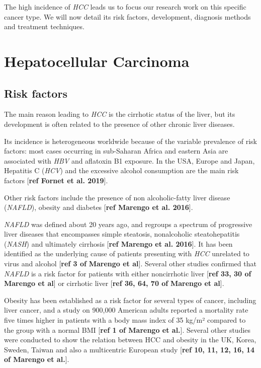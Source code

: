 \documentclass[]{article}
\begin{document}
The high incidence of \emph{HCC} leads us to focus our research work on
this specific cancer type. We will now detail its risk factors,
development, diagnosis methods and treatment techniques.

\section{Hepatocellular Carcinoma}\label{hepatocellular-carcinoma}

\subsection{Risk factors}\label{risk-factors}

The main reason leading to \emph{HCC} is the cirrhotic status of the
liver, but its development is often related to the presence of other
chronic liver diseases.

Its incidence is heterogeneous worldwide because of the variable
prevalence of risk factors: most cases occurring in sub-Saharan Africa
and eastern Asia are associated with \emph{HBV} and aflatoxin B1
exposure. In the USA, Europe and Japan, Hepatitis C (\emph{HCV}) and the
excessive alcohol consumption are the main risk factors {[}\textbf{ref
Fornet et al. 2019}{]}.

Other risk factors include the presence of non alcoholic-fatty liver
disease (\emph{NAFLD}), obesity and diabetes {[}\textbf{ref Marengo et
al. 2016}{]}.

\emph{NAFLD} was defined about 20 years ago, and regroups a spectrum of
progressive liver diseases that encompasses simple steatosis,
nonalcoholic steatohepatitis (\emph{NASH}) and ultimately cirrhosis
{[}\textbf{ref Marengo et al. 2016}{]}. It has been identified as the
underlying cause of patients presenting with \emph{HCC} unrelated to
virus and alcohol {[}\textbf{ref 3 of} \textbf{Marengo et al}{]}.
Several other studies confirmed that \emph{NAFLD} is a risk factor for
patients with either noncirrhotic liver {[}\textbf{ref 33, 30 of}
\textbf{Marengo et al}{]} or cirrhotic liver {[}\textbf{ref 36, 64, 70
of} \textbf{Marengo et al}{]}.

Obesity has been established as a risk factor for several types of
cancer, including liver cancer, and a study on 900,000 American adults
reported a mortality rate five times higher in patients with a body mass
index of 35 kg/m² compared to the group with a normal BMI {[}\textbf{ref
1 of Marengo et al.}{]}. Several other studies were conducted to show
the relation between HCC and obesity in the UK, Korea, Sweden, Taiwan
and also a multicentric European study {[}\textbf{ref 10, 11, 12, 16, 14
of Marengo et al.}{]}.
\end{document}
